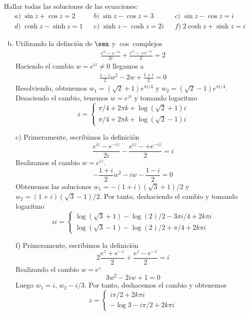 \documentclass[twoside]{article}
\begin{document}
\begin{ejercicio}{5}
Hallar todas las soluciones de las ecuaciones:
\begin{align*}
&a)\; \sin z+  \cos z = 2 & &b)\;\sin z -\cos z = 3 & &c)\;\sin z -\cos z = i\\
&d)\;\cosh z -\sinh z = 1 & &e)\;\sinh z -\cosh z = 2i & &f)\;2\cosh z +\sinh z = i
\end{align*}
\end{ejercicio}
\begin{solucion}
\begin{enumerate}[a)]
\item[]
\item Utilizando la definción de $\sen$ y $\cos$ complejos
\begin{gather*}
\frac{e^{iz}-e^{-iz}}{2i}+\frac{e^{iz}-+e^{-iz}}{2} = 2 
\end{gather*}
Haciendo el cambio $w=e^{iz}\neq 0$ llegamos a
\begin{gather*}
\frac{1-i}{2}w^2 -2w +\frac{1+i}{2} = 0
\end{gather*}
Resolviendo, obtenemos $w_1= (\sqrt{2}+1)e^{\pi i/4}$ y $w_2 = (\sqrt{2}-1)e^{\pi i/4}$. Desaciendo el cambio, tenemos $w= e^{zi}$ y tomando logaritmo
$$
z = \begin{cases}
\pi/4 +2\pi k + \log(\sqrt{2}+1)i\\
\pi/4 +2\pi k + \log(\sqrt{2}-1)i
\end{cases}
$$
\item[c)] Primeramente, escribimos la definición
$$
\frac{e^{iz}-e^{-iz}}{2i}-\frac{e^{iz}-+e^{-iz}}{2} = i
$$
Realizamos el cambio $w=e^{iz}$.
$$
-\frac{1+i}{2}w^2-iw -\frac{1-i}{2}= 0
$$
Obtenemos las soluciones $w_1 = -(1+i)(\sqrt{3}+1)/2$ y $w_2=(1+i)(\sqrt{3}-1)/2$. Por tanto, deshaciendo el cambio y tomando logaritmo
$$
zi = \begin{cases}
\log(\sqrt{3}+1)-\log(2)/2-3\pi i /4 + 2k\pi i\\
\log(\sqrt{3}-1)-\log(2)/2 + \pi/4 + 2k\pi i
\end{cases}
$$
\item[f)] Primeramente, escribimos la definición
$$
2\frac{e^z+e^{-z}}{2}+\frac{e^z-e^{-z}}{2} = i
$$
Realizando el cambio $w=e^z$
$$
3w^2-2iw+1 = 0
$$
Luego $w_1=i$, $w_2-i/3$. Por tanto, deshacemos el cambio y obtenemos
$$
z = \begin{cases}
i \pi/2 + 2k\pi i\\
-\log 3 - i\pi/2 + 2k\pi i
\end{cases}
$$
\end{enumerate}
\end{solucion}
\newpage
\end{document}
